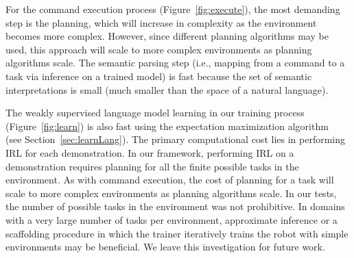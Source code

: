 \documentclass[conference]{IEEEtran}
\begin{document}
For the command execution process (Figure~\ref{fig:execute}), the most demanding step is the planning, which will increase in complexity as the environment becomes more complex. However, since different planning algorithms may be used, this approach will scale to more complex environments as planning algorithms scale. The semantic parsing step (i.e., mapping from a command to a task via inference on a trained model) is fast because the set of semantic interpretations is small (much smaller than the space of a natural language).

The weakly supervised language model learning in our training process (Figure~\ref{fig:learn})
is also fast using the expectation maximization algorithm~\cite{dempster77} (see Section~\ref{sec:learnLang}). The primary computational cost lies in performing IRL for each demonstration. In our framework, performing IRL on a demonstration requires planning for all the finite possible tasks in the environment. As with command execution, the cost of planning for a task will scale to more complex environments as planning algorithms scale. In our tests, the number of possible tasks in the environment was not prohibitive. In domains with a very large number of tasks per environment, approximate inference or a scaffolding procedure in which the trainer iteratively trains the robot with simple environments may be beneficial. We leave this investigation for future work. 
\end{document}
